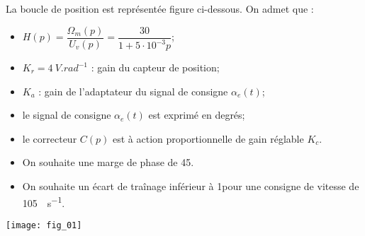 \begin{multicols}{2}
\setcounter{exo}{0}

La boucle de position est représentée figure ci-dessous. On admet que : 
\begin{itemize}
\item $H(p)=\dfrac{\Omega_m(p)}{U_v(p)}=\dfrac{30}{1+5\cdot 10^{-3} p}$;
\item $K_r = \SI{4}{V.rad^{-1}}$ : gain du capteur de position;
\item $K_a$ : gain de l'adaptateur du signal de consigne $\alpha_e(t)$;
\item le signal de consigne $\alpha_e(t)$ est exprimé en degrés;
\item le correcteur $C(p)$ est à action proportionnelle de gain réglable $K_c$.
\end{itemize}

\begin{obj}
\begin{itemize}
\item On souhaite une marge de phase de 45\degres.
\item On souhaite un écart de traînage inférieur à 1\degres pour une consigne de vitesse de \SI{105}{\degres.s^{-1}}. 
\end{itemize}
\end{obj}

\begin{center}
\texttt{[image: fig\_01]}
\end{center}

\ifprof
\begin{corrige}

\end{corrige}
\else
\fi


\ifprof
\begin{corrige}

\end{corrige}
\else
\fi


\ifprof
\begin{corrige}

\end{corrige}
\else
\fi


\end{multicols}
